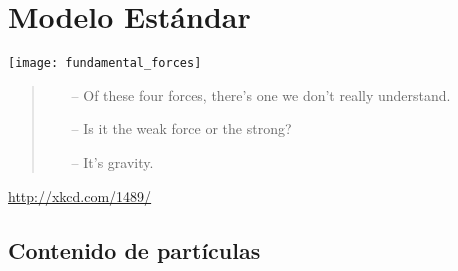 \chapter{Modelo Est\'andar}
\label{cha:modelo-estandar} %

\texttt{[image: fundamental\_forces]}

\begin{quote}
  \begin{itemize}
  \item[--]  Of these four forces, there's one we don't really understand.
  \item[--] Is it the weak force or the strong?
  \item[--]It's gravity.
  \end{itemize}
\end{quote}
\url{http://xkcd.com/1489/}

\section{Contenido de partículas}

